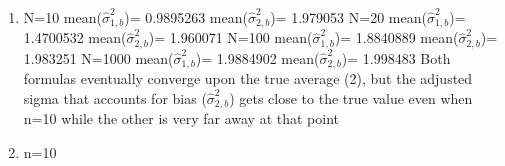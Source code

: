 \documentclass{article}
\begin{document}
\begin{enumerate}
\begin{enumerate}
				thus $2*(X'X)^{-1}$= \newline
				[,1]          [,2]          [,3]          [,4]          [,5]\newline
				[1,]  4.451362e-03 -1.955891e-03 -2.560439e-04 -4.1618e-05  9.5782e-05\newline
				[2,] -1.955891e-03  4.0460e-03 -1.9976e-03  1.866394e-05 -7.537309e-05\newline
				[3,] -2.560439e-04 -1.997684e-03  4.0690e-03 -1.8713e-03 -8.352393e-05\newline
				[4,] -4.161810e-05  1.866394e-05 -1.8713e-03  3.7301e-03 -1.833926e-03\newline
				[5,]  9.578261e-05 -7.537309e-05 -8.352393e-05 -1.8339e-03  1.8992e-03\newline
				\newline
				These values are very similar as is expected
				\item
				N=10 \newline
				mean($\hat{\sigma}_{1,b}^{2}$)= 0.9895263   \newline
				mean($\hat{\sigma}_{2,b}^{2}$)= 1.979053   \newline
				N=20 \newline
				mean($\hat{\sigma}_{1,b}^{2}$)= 1.4700532   \newline
				mean($\hat{\sigma}_{2,b}^{2}$)= 1.960071   \newline
				N=100 \newline
				mean($\hat{\sigma}_{1,b}^{2}$)= 1.8840889   \newline
				mean($\hat{\sigma}_{2,b}^{2}$)= 1.983251   \newline
				N=1000 \newline
				mean($\hat{\sigma}_{1,b}^{2}$)= 1.9884902    \newline
				mean($\hat{\sigma}_{2,b}^{2}$)= 1.998483   \newline
				\newline
				Both formulas eventually converge upon the true average (2), but the adjusted sigma that accounts for bias ($\hat{\sigma}_{2,b}^{2}$) gets close to the true value even when n=10 while the other is very far away at that point
				\item
				\begin{center}
					n=10 \newline

\end{center}
\end{enumerate}
\end{enumerate}
\end{document}
